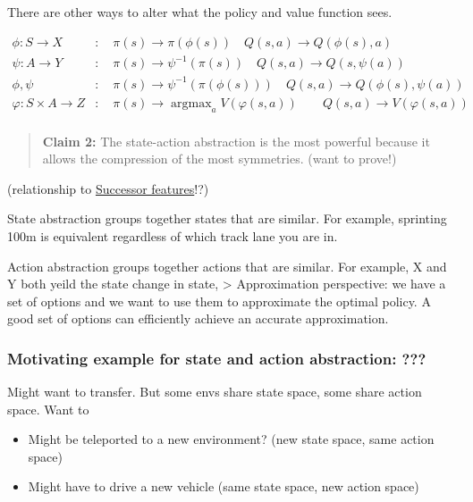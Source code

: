 There are other ways to alter what the policy and value function sees.


\begin{align}
\phi: S \to X&: \quad \pi(s) \to \pi(\phi(s)) \quad Q(s, a) \to Q(\phi(s), a) \tag{State abstraction} \\
\psi: A\to Y&: \quad \pi(s) \to \psi^{-1}(\pi(s)) \quad Q(s, a) \to Q(s, \psi(a)) \tag{Action abstraction} \\
\phi, \psi&: \quad \pi(s) \to \psi^{-1}(\pi(\phi(s))) \quad Q(s, a) \to Q(\phi(s), \psi(a)) \tag{State and action abstraction} \\
\varphi: S \times A \to Z&: \quad \pi(s)\to \mathop{\text{argmax}}_a V(\varphi(s, a)) \quad\quad Q(s, a) \to V(\varphi(s, a)) \tag{State-action abstraction} \\
\end{align}


\begin{quote}
\textbf{Claim 2:} The state-action abstraction is the most powerful
because it allows the compression of the most symmetries. (want to
prove!)
\end{quote}

(relationship to
\href{http://www.gatsby.ucl.ac.uk/~dayan/papers/d93b.pdf}{Successor
features}!?)

State abstraction groups together states that are similar. For example,
sprinting 100m is equivalent regardless of which track lane you are in.

Action abstraction groups together actions that are similar. For
example, X and Y both yeild the state change in state, \textgreater{}
Approximation perspective: we have a set of options and we want to use
them to approximate the optimal policy. A good set of options can
efficiently achieve an accurate approximation.

\hypertarget{motivating-example-for-state-and-action-abstraction}{%
\subsubsection{Motivating example for state and action abstraction:
???}\label{motivating-example-for-state-and-action-abstraction}}

Might want to transfer. But some envs share state space, some share
action space. Want to

\begin{itemize}
\tightlist
\item
  Might be teleported to a new environment? (new state space, same
  action space)
\item
  Might have to drive a new vehicle (same state space, new action space)
\end{itemize}

